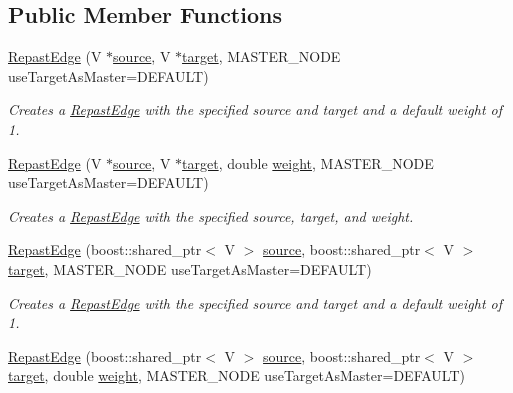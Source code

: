 \subsection*{Public Member Functions}
\begin{DoxyCompactItemize}
\item 
\hyperlink{classrepast_1_1_repast_edge_ac0205e3ee8478344fba85730fcacae14}{Repast\-Edge} (V $\ast$\hyperlink{classrepast_1_1_repast_edge_a9b8886cb5295f847eccf9743a5f5b0a1}{source}, V $\ast$\hyperlink{classrepast_1_1_repast_edge_a971ec6e45b597d2068ac42125f1b4657}{target}, M\-A\-S\-T\-E\-R\-\_\-\-N\-O\-D\-E use\-Target\-As\-Master=D\-E\-F\-A\-U\-L\-T)
\begin{DoxyCompactList}\small\item\em Creates a \hyperlink{classrepast_1_1_repast_edge}{Repast\-Edge} with the specified source and target and a default weight of 1. \end{DoxyCompactList}\item 
\hyperlink{classrepast_1_1_repast_edge_a7aaad47c69b124500c6e75e631805825}{Repast\-Edge} (V $\ast$\hyperlink{classrepast_1_1_repast_edge_a9b8886cb5295f847eccf9743a5f5b0a1}{source}, V $\ast$\hyperlink{classrepast_1_1_repast_edge_a971ec6e45b597d2068ac42125f1b4657}{target}, double \hyperlink{classrepast_1_1_repast_edge_a6402b40ba110f9f531edf345399a8e74}{weight}, M\-A\-S\-T\-E\-R\-\_\-\-N\-O\-D\-E use\-Target\-As\-Master=D\-E\-F\-A\-U\-L\-T)
\begin{DoxyCompactList}\small\item\em Creates a \hyperlink{classrepast_1_1_repast_edge}{Repast\-Edge} with the specified source, target, and weight. \end{DoxyCompactList}\item 
\hyperlink{classrepast_1_1_repast_edge_a3dbb0517855e4e69ec46da6f956b879f}{Repast\-Edge} (boost\-::shared\-\_\-ptr$<$ V $>$ \hyperlink{classrepast_1_1_repast_edge_a9b8886cb5295f847eccf9743a5f5b0a1}{source}, boost\-::shared\-\_\-ptr$<$ V $>$ \hyperlink{classrepast_1_1_repast_edge_a971ec6e45b597d2068ac42125f1b4657}{target}, M\-A\-S\-T\-E\-R\-\_\-\-N\-O\-D\-E use\-Target\-As\-Master=D\-E\-F\-A\-U\-L\-T)
\begin{DoxyCompactList}\small\item\em Creates a \hyperlink{classrepast_1_1_repast_edge}{Repast\-Edge} with the specified source and target and a default weight of 1. \end{DoxyCompactList}\item 
\hyperlink{classrepast_1_1_repast_edge_ab0a726b1f69af0a1c3a22b9e53a3aead}{Repast\-Edge} (boost\-::shared\-\_\-ptr$<$ V $>$ \hyperlink{classrepast_1_1_repast_edge_a9b8886cb5295f847eccf9743a5f5b0a1}{source}, boost\-::shared\-\_\-ptr$<$ V $>$ \hyperlink{classrepast_1_1_repast_edge_a971ec6e45b597d2068ac42125f1b4657}{target}, double \hyperlink{classrepast_1_1_repast_edge_a6402b40ba110f9f531edf345399a8e74}{weight}, M\-A\-S\-T\-E\-R\-\_\-\-N\-O\-D\-E use\-Target\-As\-Master=D\-E\-F\-A\-U\-L\-T)

\end{DoxyCompactItemize}
